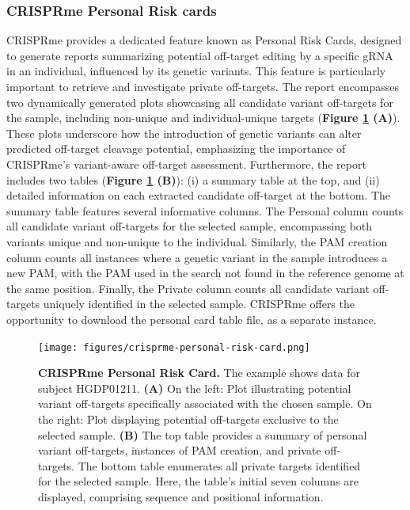 \documentclass[a4paper, titlepage, openright]{book}
\newcommand{\crisprme}{CRISPRme\xspace}
\begin{document}
\subsubsection{\crisprme Personal Risk cards}
\crisprme provides a dedicated feature known as Personal Risk Cards, designed to generate reports summarizing potential off-target editing by a specific gRNA in an individual, influenced by its genetic variants. This feature is particularly important to retrieve and investigate private off-targets. The report encompasses two dynamically generated plots showcasing all candidate variant off-targets for the sample, including non-unique and individual-unique targets (\textbf{Figure \ref{fig:crisprme-personal-risk-card} (A)}). These plots underscore how the introduction of genetic variants can alter predicted off-target cleavage potential, emphasizing the importance of \crisprme's variant-aware off-target assessment. Furthermore, the report includes two tables (\textbf{Figure \ref{fig:crisprme-personal-risk-card} (B)}): (i) a summary table at the top, and (ii) detailed information on each extracted candidate off-target at the bottom. The summary table features several informative columns. The Personal column counts all candidate variant off-targets for the selected sample, encompassing both variants unique and non-unique to the individual. Similarly, the PAM creation column counts all instances where a genetic variant in the sample introduces a new PAM, with the PAM used in the search not found in the reference genome at the same position. Finally, the Private column counts all candidate variant off-targets uniquely identified in the selected sample. \crisprme offers the opportunity to download the personal card table file, as a separate instance.

\begin{figure}[!]
    \centering
    \texttt{[image: figures/crisprme-personal-risk-card.png]}
    \caption[\crisprme Personal Risk Card]{\textbf{\crisprme Personal Risk Card.} The example shows data for subject HGDP01211. \textbf{(A)} On the left: Plot illustrating potential variant off-targets specifically associated with the chosen sample. On the right: Plot displaying potential off-targets exclusive to the selected sample. \textbf{(B)} The top table provides a summary of personal variant off-targets, instances of PAM creation, and private off-targets. The bottom table enumerates all private targets identified for the selected sample. Here, the table's initial seven columns are displayed, comprising sequence and positional information.}
    \label{fig:crisprme-personal-risk-card}
\end{figure}
\end{document}
